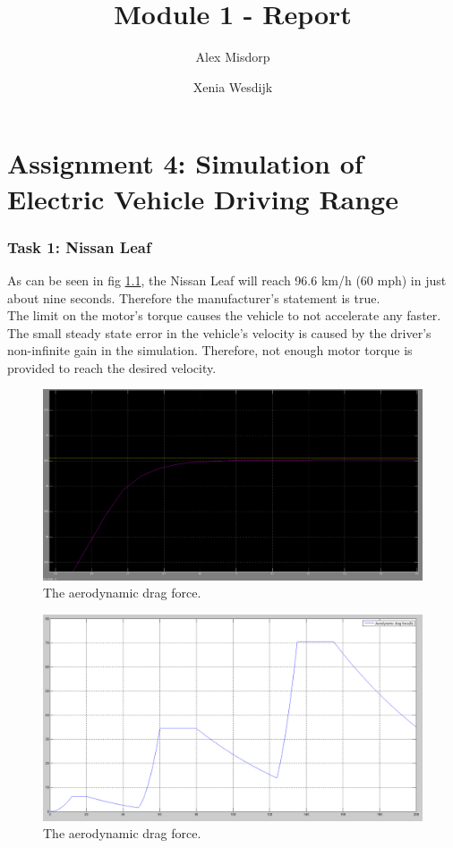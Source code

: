\documentclass[final]{scrreprt} %
\title{Module 1 - Report}
\author{Alex {Misdorp} \and Xenia {Wesdijk}}
\begin{document}
\chapter{Assignment 4: Simulation of Electric Vehicle Driving Range}
\subsection{Task 1: Nissan Leaf}
As can be seen in fig \ref{fig:acceleration}, the Nissan Leaf will reach 96.6 km/h (60 mph) in just about nine seconds. Therefore the manufacturer's statement is true.
\\The limit on the motor's torque causes the vehicle to not accelerate any faster.
\\The small steady state error in the vehicle's velocity is caused by the driver's non-infinite gain in the simulation. Therefore, not enough motor torque is provided to reach the desired velocity.
\begin{figure}[H]
\centering
\includegraphics[scale = 0.27]{resources/Accelerationzoom.png}
\caption{The aerodynamic drag force.}
\label{fig:acceleration}
\end{figure}
\begin{figure}[H]
\centering
\includegraphics[scale = 0.27]{resources/Aerodynamic.png}
\caption{The aerodynamic drag force.}
\label{fig:Aerodynamic}
\end{figure}
\end{document}

